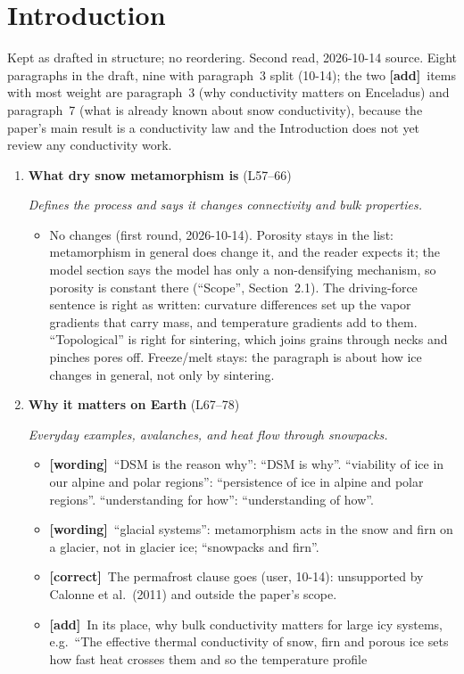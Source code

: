 \documentclass[11pt]{article}
\newcommand{\Pg}[3]{\item \textbf{#1} {\small(#2)}\par\textit{#3}}
\newcommand{\tC}{\textcolor{miss}{\textbf{[correct]}}\ }
\newcommand{\tG}{\textcolor{stale}{\textbf{[wording]}}\ }
\newcommand{\tA}{\textcolor{have}{\textbf{[add]}}\ }
\begin{document}
\section{Introduction}
Kept as drafted in structure; no reordering. Second read, 2026-10-14 source.
Eight paragraphs in the draft, nine with paragraph~3 split (10-14); the two \tA items with most weight are paragraph~3 (why
conductivity matters on Enceladus) and paragraph~7 (what is already known
about snow conductivity), because the paper's main result is a conductivity
law and the Introduction does not yet review any conductivity work.
\begin{enumerate}
\Pg{What dry snow metamorphism is}{L57--66}{Defines the process and says it changes connectivity and bulk properties.}
  \begin{itemize}
  \item No changes (first round, 2026-10-14). Porosity stays in the list:
    metamorphism in general does change it, and the reader expects it; the
    model section says the model has only a non-densifying mechanism, so
    porosity is constant there (``Scope'', Section~2.1). The driving-force
    sentence is right as written: curvature differences set up the vapor
    gradients that carry mass, and temperature gradients add to them.
    ``Topological'' is right for sintering, which joins grains through necks
    and pinches pores off. Freeze/melt stays: the paragraph is about how ice
    changes in general, not only by sintering.
  \end{itemize}
\Pg{Why it matters on Earth}{L67--78}{Everyday examples, avalanches, and heat flow through snowpacks.}
  \begin{itemize}
  \item \tG ``DSM is the reason why'': ``DSM is why''. ``viability of ice in
    our alpine and polar regions'': ``persistence of ice in alpine and polar
    regions''. ``understanding for how'': ``understanding of how''.
  \item \tG ``glacial systems'': metamorphism acts in the snow and firn on a
    glacier, not in glacier ice; ``snowpacks and firn''.
  \item \tC The permafrost clause goes (user, 10-14): unsupported by Calonne
    et al.\ (2011) and outside the paper's scope.
  \item \tA In its place, why bulk conductivity matters for large icy
    systems, e.g.\ ``The effective thermal conductivity of snow, firn and
    porous ice sets how fast heat crosses them and so the temperature profile

\end{itemize}
\end{enumerate}
\end{document}
